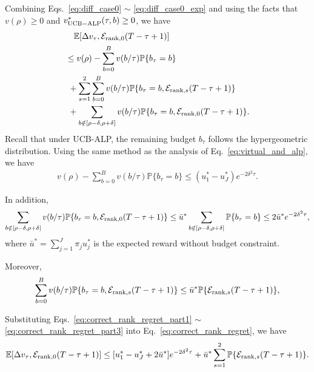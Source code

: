 Combining Eqs.~\eqref{eq:diff_case0} $\sim$ \eqref{eq:diff_case0_exp} and using the facts that $v(\rho) \geq 0$ and $v^*_{\rm UCB-ALP}(\tau, b) \geq 0$, we have
\begin{align}  \label{eq:correct_rank_regret}
&\quad\mathbb{E}[\Delta {v}_{\tau},  \mathcal{E}_{{\rm rank}, 0}(T - \tau + 1)] \nonumber\\
&\leq  v(\rho) -  \sum_{b = 0}^B v(b/\tau) \mathbb{P}\{b_{\tau} = b\} \nonumber \\
&~ + \sum_{s= 1}^2\sum_{b = 0}^B v(b/\tau) \mathbb{P}\{b_{\tau} = b, \mathcal{E}_{{\rm rank}, s}(T - \tau + 1)\}\nonumber\\
&~ + \sum_{b \notin [\rho - \delta, \rho + \delta]}v(b/\tau)\mathbb{P}\{b_{\tau} = b, \mathcal{E}_{{\rm rank}, 0}(T - \tau + 1)\}.
\end{align}
Recall that under UCB-ALP, the remaining budget $b_{\tau}$ follows the hypergeometric distribution. Using the same method as the analysis of Eq.~\eqref{eq:virtual_and_alp}, we have
\begin{eqnarray} \label{eq:correct_rank_regret_part1}
v(\rho) -  \sum_{b = 0}^B v(b/\tau) \mathbb{P}\{b_{\tau} = b\}
\leq (u_1^* - u_J^*) e^{-2\delta^2\tau}.
\end{eqnarray}

In addition,
\begin{eqnarray} \label{eq:correct_rank_regret_part2}
\sum_{b \notin [\rho - \delta, \rho + \delta]}v(b/\tau)\mathbb{P}\{b_{\tau} = b, \mathcal{E}_{{\rm rank}, 0}(T - \tau + 1)\}
\leq \bar{u}^* \sum_{b \notin [\rho - \delta, \rho + \delta]}\mathbb{P}\{b_{\tau} = b\}\leq 2\bar{u}^* e^{-2\delta^2 \tau},
\end{eqnarray}
where $\bar{u}^* = \sum_{j = 1}^J \pi_j u_j^*$ is the expected reward without budget constraint.

Moreover,
\begin{eqnarray} \label{eq:correct_rank_regret_part3}
\sum_{b = 0}^B v(b/\tau) \mathbb{P}\{b_{\tau} = b, \mathcal{E}_{{\rm rank}, s}(T - \tau + 1)\} \leq  \bar{u}^*\mathbb{P}\{\mathcal{E}_{{\rm rank}, s}(T - \tau + 1)\},
\end{eqnarray}

Substituting Eqs.~\eqref{eq:correct_rank_regret_part1} $\sim$ \eqref{eq:correct_rank_regret_part3} into Eq.~\eqref{eq:correct_rank_regret}, we have
\begin{eqnarray}  \label{eq:correct_rank_regret_results}
\mathbb{E}[\Delta {v}_{\tau},  \mathcal{E}_{{\rm rank}, 0}(T - \tau + 1)] \leq   [u_1^* - u_J^* +2\bar{u}^*] e^{-2\delta^2\tau} + \bar{u}^*\sum_{s=1}^2\mathbb{P}\{\mathcal{E}_{{\rm rank}, s}(T - \tau + 1)\}.
\end{eqnarray}


